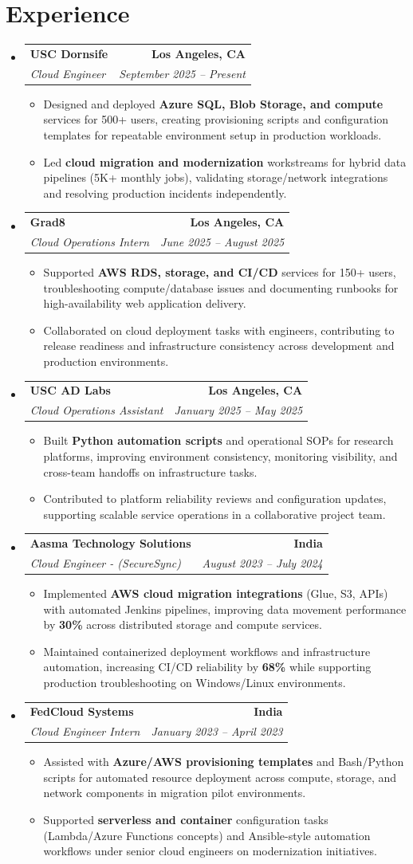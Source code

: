 \documentclass[letterpaper,10pt]{article}
\makeatletter
\newcommand{\resumeItem}[1]{\item\small{{#1 \vspace{-2pt}}}}
\newcommand{\resumeSubheading}[4]{\vspace{-1pt}\item\begin{tabular*}{1.0\textwidth}[t]{l@{\extracolsep{\fill}}r}\textbf{#1} & \textbf{\small #2} \\\textit{\small#3} & \textit{\small #4} \\\end{tabular*}\vspace{-2pt}}
\newcommand{\resumeSubHeadingListStart}{\begin{itemize}[leftmargin=0.0in, label={}]}
\newcommand{\resumeSubHeadingListEnd}{\end{itemize}}
\newcommand{\resumeItemListStart}{\begin{itemize}[leftmargin=0.15in,label=\textbullet,itemsep=2pt,topsep=0pt,parsep=0pt,partopsep=0pt]}
\newcommand{\resumeItemListEnd}{\end{itemize}\vspace{-4pt}}
\makeatother
\begin{document}
\section{Experience}
\resumeSubHeadingListStart
\resumeSubheading{USC Dornsife}{Los Angeles, CA}{Cloud Engineer}{September 2025 -- Present}
\resumeItemListStart
\resumeItem{Designed and deployed \textbf{Azure SQL, Blob Storage, and compute} services for 500+ users, creating provisioning scripts and configuration templates for repeatable environment setup in production workloads.}
\resumeItem{Led \textbf{cloud migration and modernization} workstreams for hybrid data pipelines (5K+ monthly jobs), validating storage/network integrations and resolving production incidents independently.}
\resumeItemListEnd
\resumeSubheading{Grad8}{Los Angeles, CA}{Cloud Operations Intern}{June 2025 -- August 2025}
\resumeItemListStart
\resumeItem{Supported \textbf{AWS RDS, storage, and CI/CD} services for 150+ users, troubleshooting compute/database issues and documenting runbooks for high-availability web application delivery.}
\resumeItem{Collaborated on cloud deployment tasks with engineers, contributing to release readiness and infrastructure consistency across development and production environments.}
\resumeItemListEnd
\resumeSubheading{USC AD Labs}{Los Angeles, CA}{Cloud Operations Assistant}{January 2025 -- May 2025}
\resumeItemListStart
\resumeItem{Built \textbf{Python automation scripts} and operational SOPs for research platforms, improving environment consistency, monitoring visibility, and cross-team handoffs on infrastructure tasks.}
\resumeItem{Contributed to platform reliability reviews and configuration updates, supporting scalable service operations in a collaborative project team.}
\resumeItemListEnd
\resumeSubheading{Aasma Technology Solutions}{India}{Cloud Engineer - (SecureSync)}{August 2023 -- July 2024}
\resumeItemListStart
\resumeItem{Implemented \textbf{AWS cloud migration integrations} (Glue, S3, APIs) with automated Jenkins pipelines, improving data movement performance by \textbf{30\%} across distributed storage and compute services.}
\resumeItem{Maintained containerized deployment workflows and infrastructure automation, increasing CI/CD reliability by \textbf{68\%} while supporting production troubleshooting on Windows/Linux environments.}
\resumeItemListEnd
\resumeSubheading{FedCloud Systems}{India}{Cloud Engineer Intern}{January 2023 -- April 2023}
\resumeItemListStart
\resumeItem{Assisted with \textbf{Azure/AWS provisioning templates} and Bash/Python scripts for automated resource deployment across compute, storage, and network components in migration pilot environments.}
\resumeItem{Supported \textbf{serverless and container} configuration tasks (Lambda/Azure Functions concepts) and Ansible-style automation workflows under senior cloud engineers on modernization initiatives.}
\resumeItemListEnd
\resumeSubHeadingListEnd
\vspace{-14pt}
\end{document}
